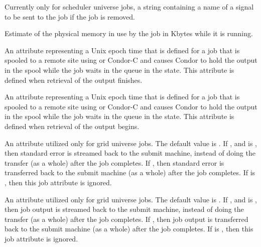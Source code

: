 \begin{description}
\item[\AdAttr{RemoveKillSig}:]    Currently only for scheduler universe jobs,
a string containing a name of
a signal to be sent to the job if the job is removed.

\item[\AdAttr{ResidentSetSize}:]  Estimate of the physical memory
in use by the job in Kbytes while it is running.

\item[\AdAttr{StageOutFinish}:]   
An attribute representing a Unix epoch time that is defined for a job that is
spooled to a remote site using  or Condor-C
and causes Condor to hold the output in the spool while the job waits 
in the queue in the  state.
This attribute is defined when retrieval of the output finishes.

\item[\AdAttr{StageOutStart}:]   
An attribute representing a Unix epoch time that is defined for a job that is
spooled to a remote site using  or Condor-C
and causes Condor to hold the output in the spool while the job waits 
in the queue in the  state.
This attribute is defined when retrieval of the output begins.

\item[\AdAttr{StreamErr}:]   
An attribute utilized only for grid universe jobs.
The default value is .
If , and  is , then 
standard error is streamed back to the submit machine, instead
of doing the transfer (as a whole) after the job completes.
If , then
standard error is transferred back to the submit machine
(as a whole) after the job completes.
If  is , then this job attribute is ignored.

\item[\AdAttr{StreamOut}:]   
An attribute utilized only for grid universe jobs.
The default value is .
If , and  is , then 
job output is streamed back to the submit machine, instead
of doing the transfer (as a whole) after the job completes.
If , then
job output is transferred back to the submit machine
(as a whole) after the job completes.
If  is , then this job attribute is ignored.


\end{description}
